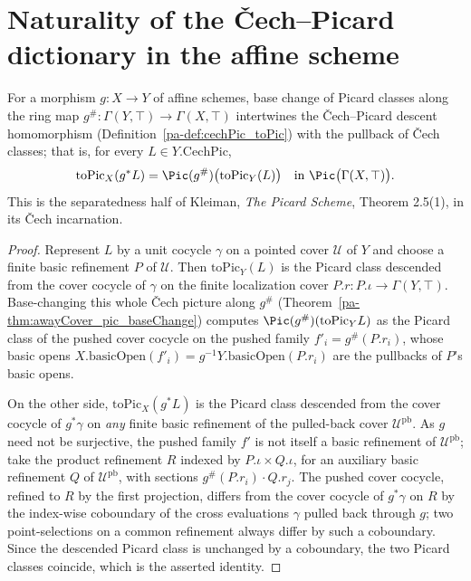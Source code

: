 \section{Naturality of the \v Cech--Picard dictionary in the affine scheme}
\label{pa-sec:cechPic_naturality}

\begin{theorem}
  \label{pa-thm:cechPic_toPic_map}
  \leanok

  For a morphism \(g \colon X \to Y\) of affine schemes, base change of Picard classes along the
  ring map \(g^{\#} \colon \Gamma(Y, \top) \to \Gamma(X, \top)\) intertwines the \v
  Cech--Picard descent homomorphism (Definition~\ref{pa-def:cechPic_toPic}) with the pullback of
  \v Cech classes; that is, for every \(L \in Y.\mathrm{CechPic}\),
  \[
    \mathrm{toPic}_X(g^{*} L) = \Pic(g^{\#})\bigl(\mathrm{toPic}_Y(L)\bigr) \quad\text{in }
    \Pic\bigl(\Gamma(X, \top)\bigr).
  \]
  This is the separatedness half of Kleiman, \emph{The Picard Scheme}, Theorem 2.5(1), in its
  \v Cech incarnation.
\end{theorem}
\begin{proof}
  \leanok
  Represent \(L\) by a unit cocycle \(\gamma\) on a pointed cover \(\mathcal U\) of \(Y\) and
  choose a finite basic refinement \(P\) of \(\mathcal U\).  Then \(\mathrm{toPic}_Y(L)\) is the
  Picard class descended from the cover cocycle of \(\gamma\) on the finite localization cover
  \(P.r \colon P.\iota \to \Gamma(Y, \top)\).  Base-changing this whole \v Cech picture along
  \(g^{\#}\) (Theorem~\ref{pa-thm:awayCover_pic_baseChange}) computes \(\Pic(g^{\#})(\mathrm{toPic}_Y
  L)\) as the Picard class of the pushed cover cocycle on the pushed family \(f'_i = g^{\#}(P.r_i)\),
  whose basic opens \(X.\mathrm{basicOpen}(f'_i) = g^{-1} Y.\mathrm{basicOpen}(P.r_i)\) are the
  pullbacks of \(P\)'s basic opens.

  On the other side, \(\mathrm{toPic}_X(g^{*} L)\) is the Picard class descended from the cover
  cocycle of \(g^{*}\gamma\) on \emph{any} finite basic refinement of the pulled-back cover
  \(\mathcal U^{\mathrm{pb}}\).  As \(g\) need not be surjective, the pushed family \(f'\) is not
  itself a basic refinement of \(\mathcal U^{\mathrm{pb}}\); take the product refinement \(R\)
  indexed by \(P.\iota \times Q.\iota\), for an auxiliary basic refinement \(Q\) of \(\mathcal
  U^{\mathrm{pb}}\), with sections \(g^{\#}(P.r_i) \cdot Q.r_j\).  The pushed cover cocycle,
  refined to \(R\) by the first projection, differs from the cover cocycle of \(g^{*}\gamma\) on
  \(R\) by the index-wise coboundary of the cross evaluations \(\gamma\) pulled back through
  \(g\); two point-selections on a common refinement always differ by such a coboundary.  Since
  the descended Picard class is unchanged by a coboundary, the two Picard classes coincide, which
  is the asserted identity.
\end{proof}

